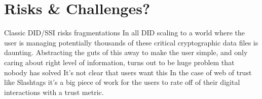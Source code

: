 \section{Risks \& Challenges?}
Classic DID/SSI risks fragmentations
In all DID scaling to a world where the user is managing potentially thousands of these critical cryptographic data files is daunting.
Abstracting the guts of this away to make the user simple, and only caring about right level of information, turns out to be huge problem that nobody has solved
It's not clear that users want this
In the case of web of trust like Slashtags it's a big piece of work for the users to rate off of their digital interactions with a trust metric.


